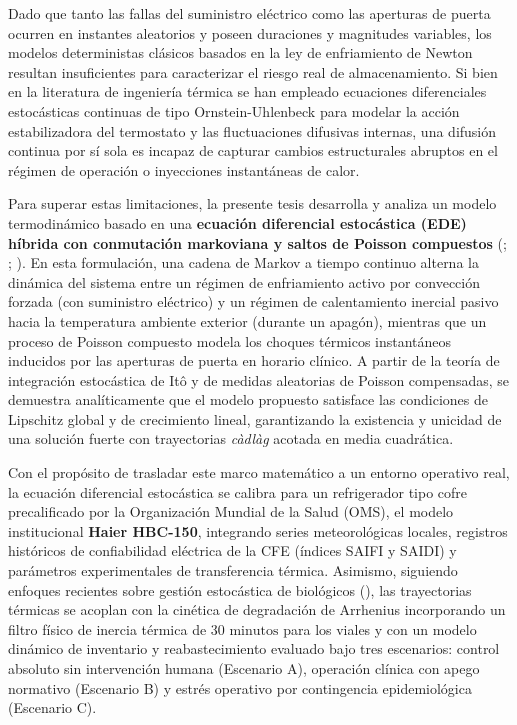 \documentclass[
  spanish,
  letterpaper,
  DIV=11,
  numbers=noendperiod]{scrreprt}
\theoremstyle{plain}
\theoremstyle{plain}
\theoremstyle{plain}
\theoremstyle{definition}
\theoremstyle{remark}
\begin{document}
Dado que tanto las fallas del suministro eléctrico como las aperturas de
puerta ocurren en instantes aleatorios y poseen duraciones y magnitudes
variables, los modelos deterministas clásicos basados en la ley de
enfriamiento de Newton resultan insuficientes para caracterizar el
riesgo real de almacenamiento. Si bien en la literatura de ingeniería
térmica se han empleado ecuaciones diferenciales estocásticas continuas
de tipo Ornstein-Uhlenbeck para modelar la acción estabilizadora del
termostato y las fluctuaciones difusivas internas, una difusión continua
por sí sola es incapaz de capturar cambios estructurales abruptos en el
régimen de operación o inyecciones instantáneas de calor.

Para superar estas limitaciones, la presente tesis desarrolla y analiza
un modelo termodinámico basado en una \textbf{ecuación diferencial
estocástica (EDE) híbrida con conmutación markoviana y saltos de Poisson
compuestos} (;
;
). En esta formulación, una
cadena de Markov a tiempo continuo alterna la dinámica del sistema entre
un régimen de enfriamiento activo por convección forzada (con suministro
eléctrico) y un régimen de calentamiento inercial pasivo hacia la
temperatura ambiente exterior (durante un apagón), mientras que un
proceso de Poisson compuesto modela los choques térmicos instantáneos
inducidos por las aperturas de puerta en horario clínico. A partir de la
teoría de integración estocástica de Itô y de medidas aleatorias de
Poisson compensadas, se demuestra analíticamente que el modelo propuesto
satisface las condiciones de Lipschitz global y de crecimiento lineal,
garantizando la existencia y unicidad de una solución fuerte con
trayectorias \emph{càdlàg} acotada en media cuadrática.

Con el propósito de trasladar este marco matemático a un entorno
operativo real, la ecuación diferencial estocástica se calibra para un
refrigerador tipo cofre precalificado por la Organización Mundial de la
Salud (OMS), el modelo institucional \textbf{Haier HBC-150}, integrando
series meteorológicas locales, registros históricos de confiabilidad
eléctrica de la CFE (índices SAIFI y SAIDI) y parámetros experimentales
de transferencia térmica. Asimismo, siguiendo enfoques recientes sobre
gestión estocástica de biológicos (), las trayectorias térmicas se acoplan con la cinética
de degradación de Arrhenius incorporando un filtro físico de inercia
térmica de \(30\text{ minutos}\) para los viales y con un modelo
dinámico de inventario y reabastecimiento evaluado bajo tres escenarios:
control absoluto sin intervención humana (Escenario A), operación
clínica con apego normativo (Escenario B) y estrés operativo por
contingencia epidemiológica (Escenario C).
\end{document}

